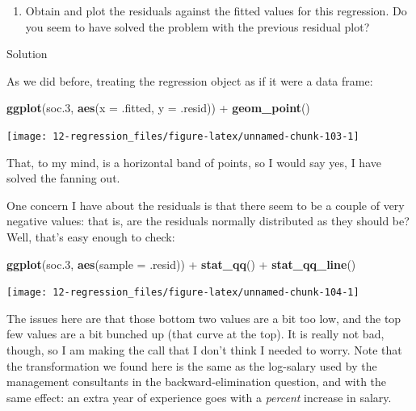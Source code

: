 \documentclass[]{tufte-book}
\newenvironment{Shaded}{}{}
\newcommand{\DataTypeTok}[1]{\textcolor[rgb]{0.56,0.13,0.00}{#1}}
\newcommand{\FloatTok}[1]{\textcolor[rgb]{0.25,0.63,0.44}{#1}}
\newcommand{\KeywordTok}[1]{\textcolor[rgb]{0.00,0.44,0.13}{\textbf{#1}}}
\newcommand{\NormalTok}[1]{#1}
\newcommand{\OperatorTok}[1]{\textcolor[rgb]{0.40,0.40,0.40}{#1}}
\newcommand{\StringTok}[1]{\textcolor[rgb]{0.25,0.44,0.63}{#1}}
\providecommand{\tightlist}{%
  \setlength{\itemsep}{0pt}\setlength{\parskip}{0pt}}
\theoremstyle{definition}
\theoremstyle{definition}
\theoremstyle{definition}
\theoremstyle{remark}
\begin{document}
\begin{enumerate}
\def\labelenumi{(\alph{enumi})}
\setcounter{enumi}{6}
\tightlist
\item
  Obtain and plot the residuals against the fitted values for this
  regression. Do you seem to have solved the problem with the previous
  residual plot?
\end{enumerate}

Solution

As we did before, treating the regression object as if it were a data
frame:

\begin{Shaded}
\begin{Highlighting}[]
\KeywordTok{ggplot}\NormalTok{(soc}\FloatTok{.3}\NormalTok{, }\KeywordTok{aes}\NormalTok{(}\DataTypeTok{x =}\NormalTok{ .fitted, }\DataTypeTok{y =}\NormalTok{ .resid)) }\OperatorTok{+}\StringTok{ }
\StringTok{    }\KeywordTok{geom_point}\NormalTok{()}
\end{Highlighting}
\end{Shaded}

\texttt{[image: 12-regression\_files/figure-latex/unnamed-chunk-103-1]}

That, to my mind, is a horizontal band of points, so I would say yes, I
have solved the fanning out.

One concern I have about the residuals is that there seem to be a couple
of very negative values: that is, are the residuals normally distributed
as they should be? Well, that's easy enough to check:

\begin{Shaded}
\begin{Highlighting}[]
\KeywordTok{ggplot}\NormalTok{(soc}\FloatTok{.3}\NormalTok{, }\KeywordTok{aes}\NormalTok{(}\DataTypeTok{sample =}\NormalTok{ .resid)) }\OperatorTok{+}\StringTok{ }\KeywordTok{stat_qq}\NormalTok{() }\OperatorTok{+}\StringTok{ }
\StringTok{    }\KeywordTok{stat_qq_line}\NormalTok{()}
\end{Highlighting}
\end{Shaded}

\texttt{[image: 12-regression\_files/figure-latex/unnamed-chunk-104-1]}

The issues here are that those bottom two values are a bit too low, and
the top few values are a bit bunched up (that curve at the top). It is
really not bad, though, so I am making the call that I don't think I
needed to worry. Note that the transformation we found here is the same
as the log-salary used by the management consultants in the
backward-elimination question, and with the same effect: an extra year
of experience goes with a \emph{percent} increase in salary.
\end{document}
